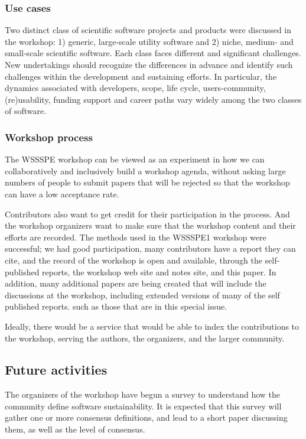 \documentclass[11pt, oneside]{amsart}
\begin{document}
\subsubsection*{Use cases}
Two distinct class of scientific software projects and products were discussed
in the workshop: 1) generic, large-scale utility software and 2) niche, medium-
and small-scale scientific software. Each class faces different and significant
challenges. New undertakings should recognize the differences in advance and
identify such challenges within the development and sustaining efforts. In
particular, the dynamics associated with developers, scope, life cycle,
users-community, (re)usability, funding support and career paths vary widely
among the two classes of software.


\subsubsection*{Workshop process}
The WSSSPE workshop can be viewed as an experiment in how we can
collaboratively and inclusively build a workshop agenda, without asking
large numbers of people to submit papers that will be rejected so that the
workshop can have a low acceptance rate.

Contributors also want to get credit for their participation in the process.
And the workshop organizers want to make sure that the workshop content and
their efforts are recorded.  The methods used in the WSSSPE1 workshop
were successful; we had good participation, many contributors have a
report they can cite, and the record of the workshop is open and available,
through the self-published reports, the workshop web site and notes site,
and this paper.  In addition, many additional papers are being created that
will include the discussions at the workshop, including extended versions
of many of the self published reports. such as those that are in this
special issue.

Ideally, there would be a service that
would be able to index the contributions to the workshop, serving the
authors, the organizers, and the larger community.

\subsection{Future activities} \label{sec:future}

The organizers of the workshop have begun a survey to understand how
the community define software sustainability.  It is expected that this survey
will gather one or more consensus definitions, and lead to a short paper
discussing them, as well as the level of consensus.
\end{document}
